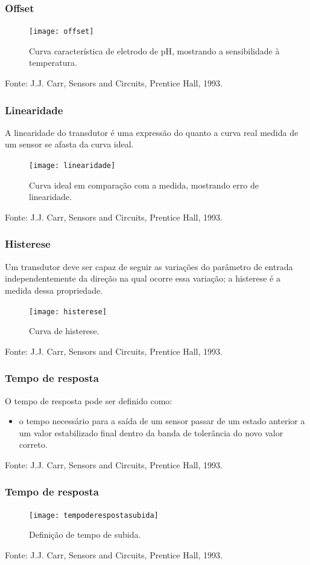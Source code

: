 \documentclass[t]{beamer}
\begin{document}
\begin{frame}
	\frametitle{Offset}
	\begin{figure}
		\texttt{[image: offset]}
		\caption{Curva característica de eletrodo de pH, mostrando a sensibilidade à temperatura.}
	\end{figure}  	
	{\scriptsize Fonte: J.J. Carr, Sensors and Circuits, Prentice Hall, 1993.}
\end{frame}

\begin{frame}
	\frametitle{Linearidade}
	A linearidade do transdutor é uma expressão do quanto a curva real medida de um sensor se afasta da curva ideal. 
	\begin{figure}
		\texttt{[image: linearidade]}
		\caption{Curva ideal em comparação com a medida, mostrando erro de linearidade.}
	\end{figure} 
	{\scriptsize Fonte: J.J. Carr, Sensors and Circuits, Prentice Hall, 1993.}
\end{frame}


\begin{frame}
	\frametitle{Histerese}
	Um transdutor deve ser capaz de seguir as variações do parâmetro de entrada independentemente da direção na qual ocorre essa variação; a histerese é a medida dessa propriedade. 	
	\begin{figure}
		\texttt{[image: histerese]}
		\caption{Curva de histerese.}
	\end{figure} 
	{\scriptsize Fonte: J.J. Carr, Sensors and Circuits, Prentice Hall, 1993.}
\end{frame}

\begin{frame}
	\frametitle{Tempo de resposta}
	O tempo de resposta pode ser definido como:
	\begin{itemize}
		\item o tempo necessário para a saída de um sensor passar de um estado anterior a um valor estabilizado final dentro da banda de tolerância do novo valor correto.
	\end{itemize}
	{\scriptsize Fonte: J.J. Carr, Sensors and Circuits, Prentice Hall, 1993.}
\end{frame}

\begin{frame}
	\frametitle{Tempo de resposta}
	\begin{figure}
		\texttt{[image: tempoderespostasubida]}
		\caption{Definição de tempo de subida.}
	\end{figure}  	
	{\scriptsize Fonte: J.J. Carr, Sensors and Circuits, Prentice Hall, 1993.}
\end{frame}
\end{document}
